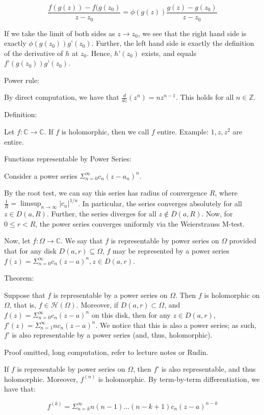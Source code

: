 \documentclass[10pt]{article}
\begin{document}
$$ \frac{f(g(z)) - f(g(z_0)}{z - z_0} = \phi(g(z)) \frac{g(z) - g(z_0)}{z - z_0} $$

If we take the limit of both sides as $z \to z_0$, we see that the right hand side is exactly $\phi(g(z_0)) g’(z_0)$. Further, the left hand side is exactly the definition of the derivative of $h$ at $z_0$. Hence, $h’(z_0)$ exists, and equals $f’(g(z_0)) g’(z_0)$.

Power rule:

By direct computation, we have that $\frac{d}{dz}(z^n) = n z^{n-1}$. This holds for all $n \in \mathbb{Z}$.

Definition:

Let $f: \mathbb{C} \to \mathbb{C}$. If $f$ is holomorphic, then we call $f$ entire. Example: $1, z, z^2$ are entire.

Functions representable by Power Series:

Consider a power series $\Sigma_{n=0}^\infty c_n (z-a_n)^n$.

By the root test, we can say this series has radius of convergence $R$, where $\frac{1}{R} = \limsup_{n \to \infty} | c_n|^{1/n}$. In particular, the series converges absolutely for all $z \in D(a,R)$. Further, the series diverges for all $z \not \in \overline{D}(a,R)$. Now, for $0 \leq r < R$, the power series converges uniformly via the Weierstrauss M-test.

Now, let $f: \Omega \to \mathbb{C}$. We say that $f$ is representable by power series on $\Omega$ provided that for any disk $D(a,r) \subseteq \Omega$, $f$ may be represented by a power series $f(z) = \Sigma_{n=0}^\infty c_n (z-a)^n, z \in D(a,r)$.

Theorem:

Suppose that $f$ is representable by a power series on $\Omega$. Then $f$ is holomorphic on $\Omega$, that is, $f \in \mathcal{H}(\Omega)$. Moreover, if $D(a,r) \subset \Omega$, and $f(z) = \Sigma_{n=0}^\infty c_n (z-a)^n$ on this disk, then for any $z \in D(a,r)$, $f’(z) = \Sigma_{n=1}^\infty nc_n(z-a)^n$. We notice that this is also a power series; as such, $f’$ is also representable by a power series (and, thus, holomorphic).

Proof omitted, long computation, refer to lecture notes or Rudin.

If $f$ is representable by power series on $\Omega$, then $f’$ is also representable, and thus holomorphic. Moreover, $f^{(n)}$ is holomorphic. By term-by-term differentiation, we have that:

$$ f^{(k)} = \Sigma_{n=k}^\infty n(n-1)...(n-k+1) c_n (z-a)^{n-k}$$
\end{document}
